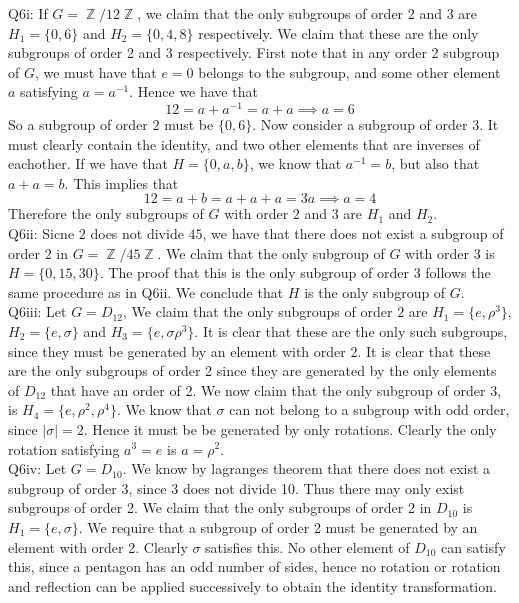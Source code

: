 \documentclass[letterpaper]{article}
\DeclareMathOperator{\Z}{\mathbb{Z}}
\begin{document}
\noindent
Q6i: If $G = \Z / 12\Z$, we claim that the only subgroups of order 2 and 3 are $H_1 =\{0,6\} $ and $H_2 =\{0,4,8\}$ respectively. We claim that these are the only subgroups of order 2 and 3 respectively. First note that in any order 2 subgroup of $G$, we must have that $e=0$ belongs to the subgroup, and some other element $a$ satisfying $a = a^{-1}$. Hence we have that $$12= a+a^{-1} = a+a\implies a =6$$
So a subgroup of order $2$ must be $\{0,6\}$. Now consider a subgroup of order 3. It must clearly contain the identity, and two other elements that are inverses of eachother. If we have that $H = \{0,a,b\}$, we know that $a^{-1} = b$, but also that $a+a=b$. This implies that 
$$12 = a+b = a+a+a = 3a\implies a = 4$$ Therefore the only subgroups of $G$ with order $2$ and $3$ are $H_1$ and $H_2$. 
\newline \\  \noindent 
Q6ii: Sicne $2$ does not divide $45$, we have that there does not exist a subgroup of order $2$ in $G = \Z / 45 \Z$. We claim that the only subgroup of $G$ with order 3 is $H = \{0,15,30\}$. The proof that this is the only subgroup of order 3 follows the same procedure as in Q6ii. We conclude that $H$ is the only subgroup of $G$. 
\newline \\ \noindent 
Q6iii: Let $G = D_{12}$, We claim that the only subgroups of order $2$ are $H_1 = \{e, \rho^{3}\}$, $H_2 =\{e,\sigma\}$ and $H_3 = \{e, \sigma \rho^{3}\}$. It is clear that these are the only such subgroups, since they must be generated by an element with order 2. It is clear that these are the only subgroups of order 2 since they are generated by the only elements of $D_{12}$ that have an order of 2. We now claim that the only subgroup of order 3, is $H_4 = \{e,\rho^2, \rho^4\}$. We know that $\sigma$ can not belong to a subgroup with odd order, since $|\sigma| = 2$. Hence it must be be generated by only rotations. Clearly the only rotation satisfying $a^3 = e$ is $a = \rho^2$. 
\newline \\ \noindent
Q6iv: Let $G = D_{10}$. We know by lagranges theorem that there does not exist a subgroup of order 3, since 3 does not divide 10. Thus there may only exist subgroups of order 2. We claim that the only subgroups of order 2 in $D_{10}$ is $H_1 = \{e,\sigma\}$. We require that a subgroup of order 2 must be generated by an element with order 2. Clearly $\sigma$ satisfies this. No other element of $D_{10}$ can satisfy this, since a pentagon has an odd number of sides, hence no rotation or rotation and reflection can be applied successively to obtain the identity transformation. 
\end{document}

